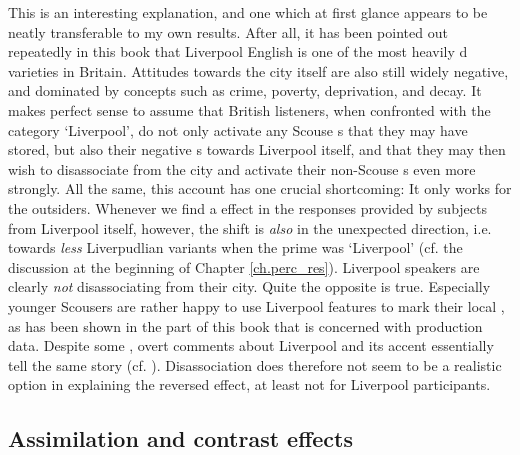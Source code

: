 This is an interesting explanation, and one which at first glance appears to be neatly transferable to my own results.
After all, it has been pointed out repeatedly in this book that Liverpool English is one of the most heavily d varieties in Britain.
Attitudes towards the city itself are also still widely negative, and dominated by concepts such as crime, poverty, deprivation, and decay.
It makes perfect sense to assume that British listeners, when confronted with the category `Liverpool', do not only activate any Scouse s that they may have stored, but also their negative s towards Liverpool itself, and that they may then wish to disassociate from the city and activate their non-Scouse s even more strongly.
All the same, this account has one crucial shortcoming: It only works for the outsiders.
Whenever we find a  effect in the responses provided by subjects from Liverpool itself, however, the shift is \emph{also} in the unexpected direction, i.e. towards \emph{less} Liverpudlian variants when the prime was `Liverpool' (cf. the discussion at the beginning of Chapter \ref{ch.perc_res}).
Liverpool speakers are clearly \emph{not} disassociating from their city.
Quite the opposite is true.
Especially younger Scousers are rather happy to use Liverpool features to mark their local , as has been shown in the part of this book that is concerned with production data.
Despite some , overt comments about Liverpool and its accent essentially tell the same story (cf. ).
Disassociation does therefore not seem to be a realistic option in explaining the reversed  effect, at least not for Liverpool participants.

		\subsection{Assimilation and contrast effects}

